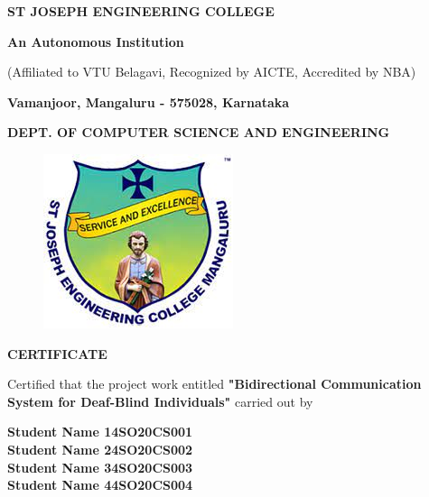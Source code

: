 \documentclass[12pt,a4paper]{report}
\begin{document}
\begin{center}
\LARGE \textbf{ST JOSEPH ENGINEERING COLLEGE}
\par
\Large \textbf{An Autonomous Institution}
\par \large{(Affiliated to VTU Belagavi, Recognized by AICTE, Accredited by NBA)}
\par \vspace{3pt}
\large \textbf{Vamanjoor, Mangaluru - 575028, Karnataka}
\par \vspace{12pt}  
\par
\large \textbf{DEPT. OF COMPUTER SCIENCE AND ENGINEERING}
\par
\begin{figure}[hbtp]
\centering
\includegraphics[scale=0.5]{./pic/sjeclogo}
\end{figure}


{\Large \textbf{CERTIFICATE}}
\end{center}
\justifying
\par
{}
\noindent 
Certified that the project work entitled \textbf{"Bidirectional Communication System for Deaf-Blind Individuals"} carried out by\vspace{0.25in} 
\par

\noindent 
\vspace{2pt} 
\textbf{\large \quad \quad \qquad Student Name 1}\qquad \qquad \qquad \qquad \textbf{\large 4SO20CS001}\\ \vspace{2pt} 
\textbf{\large \quad \quad \qquad Student Name 2}\qquad \qquad \qquad \qquad \textbf{\large 4SO20CS002}\\ \vspace{2pt}
\textbf{\large \quad \quad \qquad Student Name 3}\qquad \qquad \qquad \qquad \textbf{\large 4SO20CS003}\\ \vspace{2pt}
\textbf{\large \quad \quad \qquad Student Name 4}\qquad \qquad \qquad \qquad \textbf{\large 4SO20CS004}\\ \vspace{1pt}
\justifying
\end{document}
